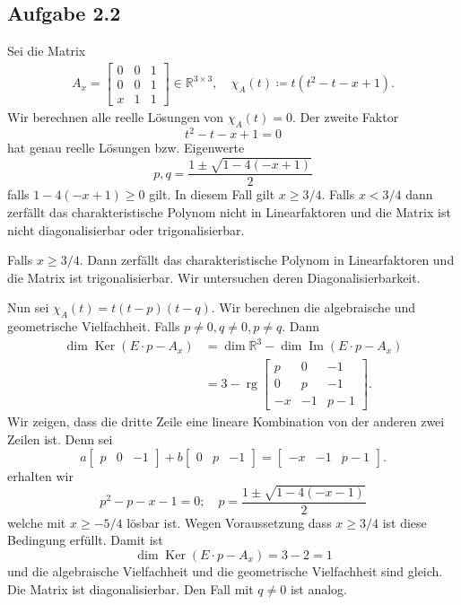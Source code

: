 \documentclass[draft,a5paper]{article}
\theoremstyle{remark}
\DeclareMathOperator{\Ker}{Ker}
\DeclareMathOperator{\Img}{Im}
\DeclareMathOperator{\rg}{rg}
\begin{document}
\subsection{Aufgabe 2.2}
Sei die Matrix
\begin{align*}
  A_{x} =
  \begin{bmatrix}
    0 & 0 & 1 \\
    0 & 0 & 1 \\
    x & 1 & 1
  \end{bmatrix}
  \in \mathbb{R}^{3 \times 3}, \quad \chi_{A}(t) \coloneq t(t^{2}-t-x+1).
\end{align*}
Wir berechnen alle reelle Lösungen von \(\chi_{A}(t)=0\).  Der zweite
Faktor
\[t^{2}-t-x+1=0\] hat genau reelle Lösungen bzw. Eigenwerte
\[p,q=\frac{1\pm\sqrt{1-4(-x+1)}}{2}\] falls \(1-4(-x+1) \ge 0\) gilt.
In diesem Fall gilt \(x \ge 3/4\).
Falls \(x < 3/4\) dann zerfällt das
charakteristische Polynom nicht in Linearfaktoren und die Matrix ist
nicht diagonalisierbar oder trigonalisierbar.

Falls \(x \ge 3/4\).  Dann zerfällt das charakteristische Polynom in
Linearfaktoren und die Matrix ist trigonalisierbar.  Wir untersuchen
deren Diagonalisierbarkeit.

Nun sei \(\chi_{A}(t)=t(t-p)(t-q)\).  Wir berechnen die algebraische und
geometrische Vielfachheit.  Falls \(p \ne 0, q \ne 0, p \ne q\).  Dann
\begin{align*}
  \dim \Ker (E \cdot p - A_{x})
  &= \dim \mathbb{R}^{3} - \dim \Img (E \cdot p - A_{x}) \\
  &=3 - \rg
    \begin{bmatrix}
      p & 0 & -1 \\
      0 & p & -1 \\
      -x & -1 & p - 1
    \end{bmatrix}.
\end{align*}
Wir zeigen, dass die dritte Zeile eine lineare Kombination von der
anderen zwei Zeilen ist.  Denn sei
\[a
  \begin{bmatrix}
    p & 0 & -1
  \end{bmatrix}
  + b
  \begin{bmatrix}
    0 & p & -1
  \end{bmatrix}
  =
  \begin{bmatrix}
    -x & -1 & p-1
  \end{bmatrix}.
\]
erhalten wir
\[p^{2}-p-x-1=0; \quad p = \frac{1 \pm \sqrt{1-4(-x-1)}}{2}\] welche mit
\(x \ge -5/4\) lösbar ist.  Wegen Voraussetzung dass \(x \ge 3/4\) ist diese
Bedingung erfüllt.  Damit ist
\[\dim \Ker (E \cdot p - A_{x}) = 3 - 2 = 1\]
und die algebraische Vielfachheit und die geometrische Vielfachheit
sind gleich.  Die Matrix ist diagonalisierbar.  Den Fall mit \(q \ne 0\)
ist analog.
\end{document}
